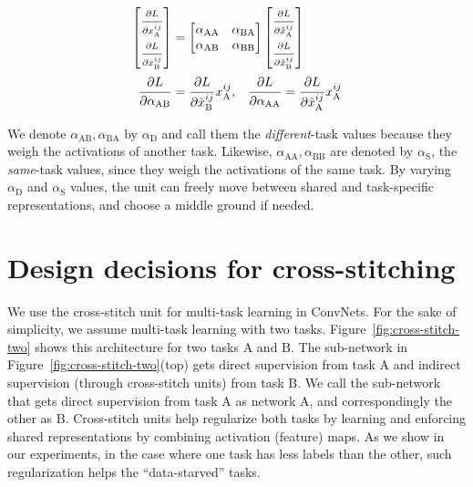 \documentclass[10pt,twocolumn,letterpaper]{article}
\begin{document}
\begin{align}
\label{eqn:backward}
\begin{bmatrix}
\frac{\strut\partial L}{\strut\partial x^{ij}_\mathrm{A}} \\
\frac{\strut\partial L}{\strut\partial x^{ij}_\mathrm{B}}
\end{bmatrix} &=
\begin{bmatrix}
\alpha_\mathrm{AA}  & \alpha_\mathrm{BA} \\
\alpha_\mathrm{AB}  & \alpha_\mathrm{BB} \\
\end{bmatrix}
\begin{bmatrix}
\frac{\strut\partial L}{\strut\partial \tilde{x}^{ij}_\mathrm{A}} \\
\frac{\strut\partial L}{\strut\partial \tilde{x}^{ij}_\mathrm{B}}
\end{bmatrix} \\
\frac{\strut\partial L}{\strut\partial{\alpha_\mathrm{AB}}} &= \frac{\strut\partial L}{\strut\partial \tilde{x}^{ij}_\mathrm{B}}  x^{ij}_\mathrm{A}, \;\;\;
\frac{\strut\partial L}{\strut\partial{\alpha_\mathrm{AA}}} = \frac{\strut\partial L}{\strut\partial \tilde{x}^{ij}_\mathrm{A}}  x^{ij}_\mathrm{A}
\end{align}


We denote $\alpha_\mathrm{AB}, \alpha_\mathrm{BA}$ by $\alpha_\mathrm{D}$ and call them the \emph{different}-task values because they weigh the activations of another task. Likewise, $\alpha_\mathrm{AA}, \alpha_\mathrm{BB}$ are denoted by $\alpha_\mathrm{S}$, the \emph{same}-task values, since they weigh the activations of the same task.
By varying $\alpha_\mathrm{D}$ and $\alpha_\mathrm{S}$ values, the unit can freely move between shared and task-specific representations, and choose a middle ground if needed.
\section{Design decisions for cross-stitching}
\label{sec:twoTowers}
We use the cross-stitch unit for multi-task learning in ConvNets. For the sake of simplicity, we assume multi-task learning with two tasks. Figure~\ref{fig:cross-stitch-two} shows this architecture for two tasks $\mathrm{A}$ and $\mathrm{B}$. The sub-network in Figure~\ref{fig:cross-stitch-two}(top) gets direct supervision from task $\mathrm{A}$ and indirect supervision (through cross-stitch units) from task $\mathrm{B}$. We call the sub-network that gets direct supervision from task $\mathrm{A}$ as network $\mathrm{A}$, and correspondingly the other as $\mathrm{B}$.
Cross-stitch units help regularize both tasks by learning and enforcing shared representations by combining activation (feature) maps.
As we show in our experiments, in the case where one task has less labels than the other, such regularization helps the ``data-starved'' tasks. 
\end{document}
